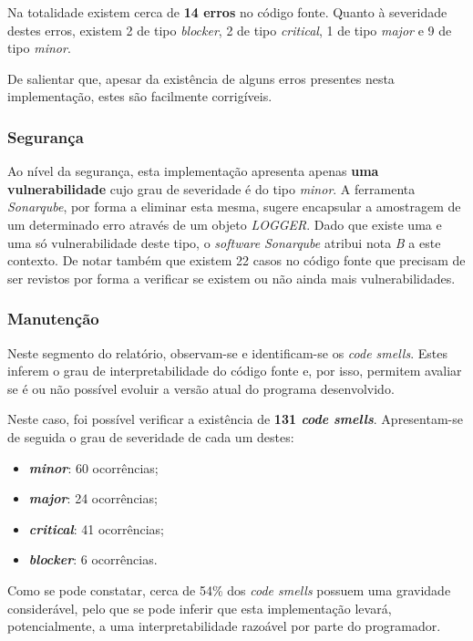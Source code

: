 \documentclass[a4paper]{report}
\begin{document}
Na totalidade existem cerca de \textbf{14 erros} no código fonte. Quanto à severidade destes erros, existem 2 de tipo \textit{blocker}, 2 de tipo \textit{critical}, 1 de tipo \textit{major} e 9 de tipo \textit{minor}.
\par De salientar que, apesar da existência de alguns erros presentes nesta implementação, estes são facilmente corrigíveis.

\subsubsection{Segurança}
Ao nível da segurança, esta implementação apresenta apenas \textbf{uma vulnerabilidade} cujo grau de severidade é do tipo \textit{minor}. A ferramenta \textit{Sonarqube}, por forma a eliminar esta mesma, sugere encapsular a amostragem de um determinado erro através de um objeto \textit{LOGGER}. Dado que existe uma e uma só vulnerabilidade deste tipo, o \textit{software} \textit{Sonarqube} atribui nota \textit{B} a este contexto. De notar também que existem 22 casos no código fonte que precisam de ser revistos por forma a verificar se existem ou não ainda mais vulnerabilidades.

\subsubsection{Manutenção}
Neste segmento do relatório, observam-se e identificam-se os \textit{code smells}. Estes inferem o grau de interpretabilidade do código fonte e, por isso, permitem avaliar se é ou não possível evoluir a versão atual do programa desenvolvido.

Neste caso, foi possível verificar a existência de \textbf{131 \textit{code smells}}. Apresentam-se de seguida o grau de severidade de cada um destes:
\begin{itemize}
    \item \textbf{\textit{minor}}: 60 ocorrências;
    \item \textbf{\textit{major}}: 24 ocorrências;
    \item \textbf{\textit{critical}}: 41 ocorrências;
    \item \textbf{\textit{blocker}}: 6 ocorrências.
\end{itemize}

Como se pode constatar, cerca de 54\% dos \textit{code smells} possuem uma gravidade considerável, pelo que se pode inferir que esta implementação levará, potencialmente, a uma interpretabilidade razoável por parte do programador.
\end{document}

